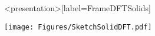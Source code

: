 \begin{frame}<presentation>[label=FrameDFTSolids]

  \centering
  \texttt{[image: Figures/SketchSolidDFT.pdf]}


\end{frame}
